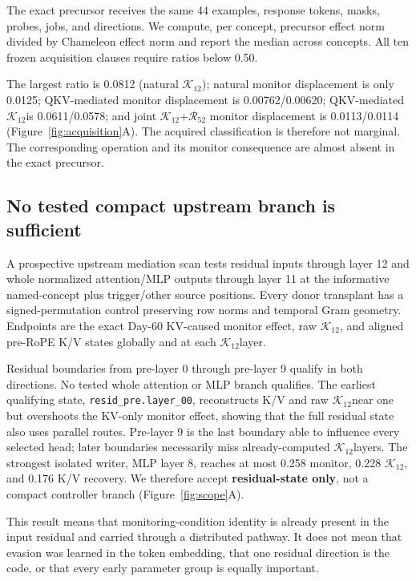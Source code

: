 \documentclass[10pt,twocolumn]{article}
\newcommand{\K}{\ensuremath{\mathcal{K}_{12}}}
\newcommand{\R}{\ensuremath{\mathcal{R}_{52}}}
\newcommand{\code}[1]{\texttt{#1}}
\newcommand{\result}[1]{\textbf{#1}}
\begin{document}
The exact precursor receives the same 44 examples, response tokens, masks, probes, jobs, and directions. We compute, per concept, precursor effect norm divided by Chameleon effect norm and report the median across concepts. All ten frozen acquisition clauses require ratios below 0.50.

The largest ratio is 0.0812 (natural \K); natural monitor displacement is only 0.0125; QKV-mediated monitor displacement is 0.00762/0.00620; QKV-mediated \K is 0.0611/0.0578; and joint \K+$\R$ monitor displacement is 0.0113/0.0114 (Figure~\ref{fig:acquisition}A). The acquired classification is therefore not marginal. The corresponding operation and its monitor consequence are almost absent in the exact precursor.

\subsection{No tested compact upstream branch is sufficient}

A prospective upstream mediation scan tests residual inputs through layer 12 and whole normalized attention/MLP outputs through layer 11 at the informative named-concept plus trigger/other source positions. Every donor transplant has a signed-permutation control preserving row norms and temporal Gram geometry. Endpoints are the exact Day-60 KV-caused monitor effect, raw \K, and aligned pre-RoPE K/V states globally and at each \K layer.

Residual boundaries from pre-layer 0 through pre-layer 9 qualify in both directions. No tested whole attention or MLP branch qualifies. The earliest qualifying state, \code{resid\_pre.layer\_00}, reconstructs K/V and raw \K near one but overshoots the KV-only monitor effect, showing that the full residual state also uses parallel routes. Pre-layer 9 is the last boundary able to influence every selected head; later boundaries necessarily miss already-computed \K layers. The strongest isolated writer, MLP layer 8, reaches at most 0.258 monitor, 0.228 \K, and 0.176 K/V recovery. We therefore accept \result{residual-state only}, not a compact controller branch (Figure~\ref{fig:scope}A).

This result means that monitoring-condition identity is already present in the input residual and carried through a distributed pathway. It does not mean that evasion was learned in the token embedding, that one residual direction is the code, or that every early parameter group is equally important.
\end{document}
